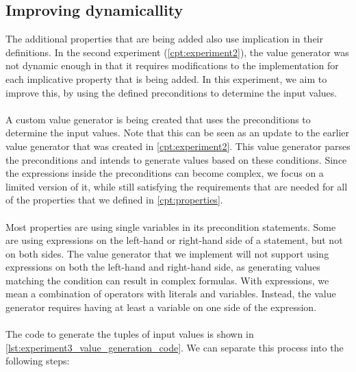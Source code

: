 \subsection{Improving dynamicallity}
The additional properties that are being added also use implication in their
definitions. In the second experiment (\autoref{cpt:experiment2}), the value
generator was not dynamic enough in that it requires modifications to the
implementation for each implicative property that is being added. In this
experiment, we aim to improve this, by using the defined preconditions to
determine the input values.\\
\\
A custom value generator is being created that uses the preconditions to determine the
input values. Note that this can be seen as an update to the earlier value generator that was
created in \autoref{cpt:experiment2}. This value generator parses the
preconditions and intends to generate values based on these conditions. Since
the expressions inside the preconditions can become complex, we focus on
a limited version of it, while still satisfying the requirements that are needed
for all of the properties that we defined in \autoref{cpt:properties}.\\
\\
Most properties are using single variables in its precondition statements. Some
are using expressions on the left-hand or right-hand side of a statement, but
not on both sides. The value generator that we implement will not support using
expressions on both the left-hand and right-hand side, as generating values
matching the condition can result in complex formulas. With expressions, we mean a
combination of operators with literals and variables. Instead, the value generator requires having at least a variable on one side of the
expression.\\
\\
The code to generate the tuples of input values is shown in
\autoref{lst:experiment3_value_generation_code}. We can separate this process
into the following steps:
\def \valueGeneratorStepOne{Initialize value generation data (\hyperref[lst:experiment3_value_generation_code]{Line 7})}
\def \valueGeneratorStepTwo{Traverse and handle statements (\hyperref[lst:experiment3_value_generation_code]{Line 9-13})}
\def \valueGeneratorStepThree{Generate values for remaining, unassigned, variables (\hyperref[lst:experiment3_value_generation_code]{Line 15-18})}
\def \valueGeneratorStepFour{Add values to resulting list (\hyperref[lst:experiment3_value_generation_code]{Line 21})}
